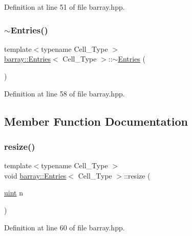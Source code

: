 Definition at line 51 of file barray.\+hpp.

\mbox{\label{classbarray_1_1_entries_a811ad3b68c7d5e25930b84d249da1345}} 
\subsubsection{\texorpdfstring{$\sim$\+Entries()}{~Entries()}}
{\footnotesize\ttfamily template$<$typename Cell\+\_\+\+Type $>$ \\
\hyperlink{classbarray_1_1_entries}{barray\+::\+Entries}$<$ Cell\+\_\+\+Type $>$\+::$\sim$\hyperlink{classbarray_1_1_entries}{Entries} (\begin{DoxyParamCaption}{ }\end{DoxyParamCaption})\hspace{0.3cm}{\ttfamily [inline]}}



Definition at line 58 of file barray.\+hpp.



\subsection{Member Function Documentation}
\mbox{\label{classbarray_1_1_entries_a7d4055f1486d513ae80b94ea2d8e105f}} 
\subsubsection{\texorpdfstring{resize()}{resize()}}
{\footnotesize\ttfamily template$<$typename Cell\+\_\+\+Type $>$ \\
void \hyperlink{classbarray_1_1_entries}{barray\+::\+Entries}$<$ Cell\+\_\+\+Type $>$\+::resize (\begin{DoxyParamCaption}\item[{\hyperlink{namespacebarray_af9756a31953db233f80a9cfe1ef31c32}{uint}}]{n }\end{DoxyParamCaption})\hspace{0.3cm}{\ttfamily [inline]}}



Definition at line 60 of file barray.\+hpp.



